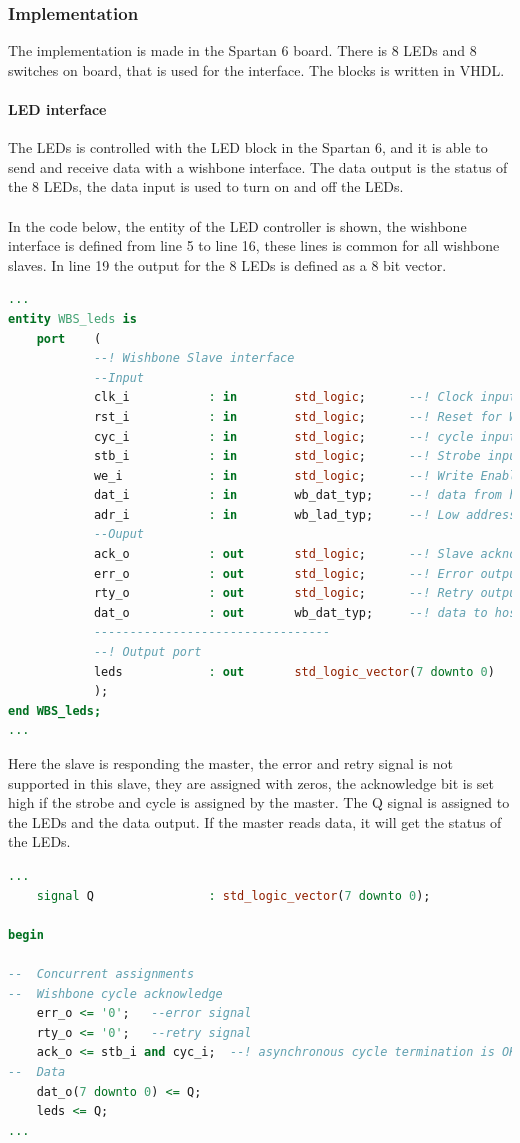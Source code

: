 \subsubsection{Implementation}
The implementation is made in the Spartan 6 board. There is 8 LEDs and 8 switches on board, that is used for the interface. The blocks is written in VHDL.
\paragraph{LED interface}
The LEDs is controlled with the LED block in the Spartan 6, and it is able to send and receive data with a wishbone interface. The data output is the status of the 8 LEDs, the data input is used to turn on and off the LEDs.\\\\
In the code below, the entity of the LED controller is shown, the wishbone interface is defined from line 5 to line 16, these lines is common for all wishbone slaves. In line 19 the output for the 8 LEDs is defined as a 8 bit vector.
\begin{lstlisting}[language=VHDL]
...
entity WBS_leds is
	port	(
			--! Wishbone Slave interface
			--Input
			clk_i			: in		std_logic;		--! Clock input from SYSCON
			rst_i			: in		std_logic;		--! Reset for Wishbone interface
			cyc_i			: in		std_logic;		--! cycle input, asserted when cycle is in progress
			stb_i			: in		std_logic;		--! Strobe input, similar to Chip Select
			we_i			: in		std_logic;		--! Write Enable: High=WR, Low=RD
			dat_i			: in		wb_dat_typ;		--! data from host
			adr_i			: in		wb_lad_typ;		--! Low address input
			--Ouput
			ack_o			: out		std_logic;		--! Slave acknowledge output, asserted after sucessful cycle
			err_o			: out		std_logic;		--! Error output, abnormal cycle termination
			rty_o			: out		std_logic;		--! Retry output, slave not ready
			dat_o			: out		wb_dat_typ;		--! data to host
			---------------------------------
			--! Output port
			leds			: out		std_logic_vector(7 downto 0)
			);
end WBS_leds;
...
\end{lstlisting}
Here the slave is responding the master, the error and retry signal is not supported in this slave, they are assigned with zeros, the acknowledge bit is set high if the strobe and cycle is assigned by the master. The Q signal is assigned to the LEDs and the data output. If the master reads data, it will get the status of the LEDs.
\begin{lstlisting}[language=VHDL]
...
	signal Q				: std_logic_vector(7 downto 0);

begin

--  Concurrent assignments
--	Wishbone cycle acknowledge
	err_o <= '0';	--error signal
	rty_o <= '0';	--retry signal
	ack_o <= stb_i and cyc_i;  --! asynchronous cycle termination is OK here.
--	Data
	dat_o(7 downto 0) <= Q;
	leds <= Q;
...
\end{lstlisting}
